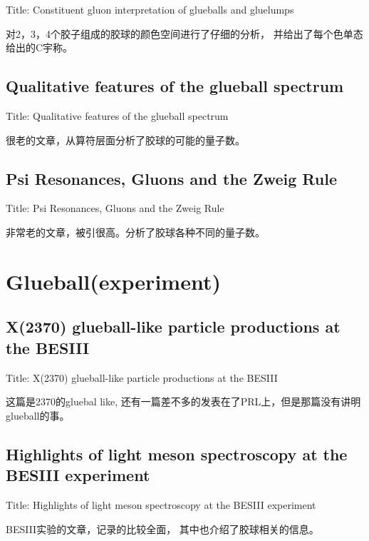 \documentclass{article}
\begin{document}
Title: \quad  Constituent gluon interpretation of glueballs and gluelumps  \cite{Boulanger_2008} 

对2，3，4个胶子组成的胶球的颜色空间进行了仔细的分析， 并给出了每个色单态给出的C宇称。

\subsection{Qualitative features of the glueball spectrum}

Title: \quad  Qualitative features of the glueball spectrum \cite{JAFFE1986344}

很老的文章，从算符层面分析了胶球的可能的量子数。  




\subsection{Psi Resonances, Gluons and the Zweig Rule }

Title: \quad  Psi Resonances, Gluons and the Zweig Rule \cite{Fritzsch:1975tx} 

非常老的文章，被引很高。分析了胶球各种不同的量子数。



\section{Glueball(experiment)}

\subsection{X(2370) glueball-like particle productions at the BESIII} 

Title: X(2370) glueball-like particle productions at the BESIII \cite{Cao:2024mfn}

这篇是2370的gluebal like, 还有一篇差不多的发表在了PRL上，但是那篇没有讲明glueball的事。 



\subsection{Highlights of light meson spectroscopy at the BESIII experiment}

Title: Highlights of light meson spectroscopy at the BESIII experiment \cite{Jin:2021vct}

BESIII实验的文章，记录的比较全面， 其中也介绍了胶球相关的信息。 
\end{document}
